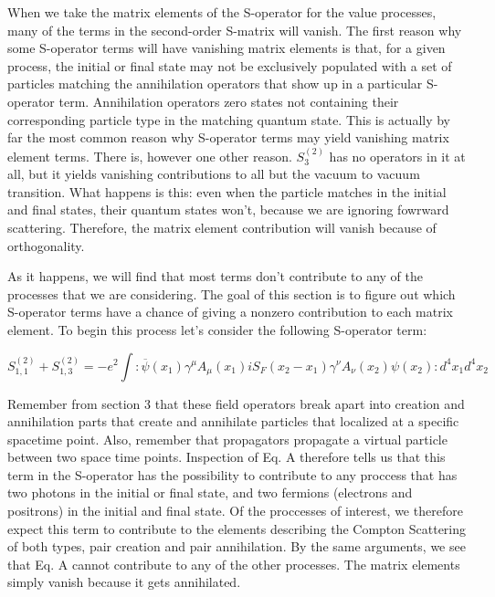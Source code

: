 \documentclass[a4]{article}
\begin{document}
    When we take the matrix elements of the S-operator for the value processes, many of the terms in the second-order S-matrix will vanish. The first
    reason why some S-operator terms will have vanishing matrix elements is that, for a given process, the initial or final state may not be 
    exclusively populated with a set of particles matching the annihilation operators that show up in a particular S-operator term. Annihilation 
    operators zero states not containing their corresponding particle type in the matching quantum state. This is actually by far the most common 
    reason why S-operator terms may yield vanishing matrix element terms. There is, however one other reason. $S^{(2)}_{3}$ has no operators in it at
    all, but it yields vanishing contributions to all but the vacuum to vacuum transition. What happens is this: even when the particle matches in the
    initial and final states, their quantum states won't, because we are ignoring fowrward scattering. Therefore, the matrix element contribution will
    vanish because of orthogonality.

    As it happens, we will find that most terms don't contribute to any of the processes that we are considering. The goal of this section is to figure
    out which S-operator terms have a chance of giving a nonzero contribution to each matrix element. To begin this process let's consider the following
    S-operator term:

    \begin{framed}
        \begin{equation}
            S^{(2)}_{1,1} + S^{(2)}_{1,3} = - e^{2} \int :\overline{\psi} (x_1) \gamma^{\mu} A_{\mu} (x_1) i S_{F} (x_2 - x_1) \gamma^{\nu} A_{\nu} (x_2) \psi (x_2): d^{4} x_{1} d^{4} x_{2}
        \end{equation}
    \end{framed}

    Remember from section 3 that these field operators break apart into creation and annihilation parts that create and annihilate particles that localized
    at a specific spacetime point. Also, remember that propagators propagate a virtual particle between two space time points. Inspection of Eq. A therefore
    tells us that this term in the S-operator has the possibility to contribute to any proccess that has two photons in the initial or final state, and two
    fermions (electrons and positrons) in the initial and final state. Of the proccesses of interest, we therefore expect this term to contribute to the
    elements describing the Compton Scattering of both types, pair creation and pair annihilation. By the same arguments, we see that Eq. A cannot contribute
    to any of the other processes. The matrix elements simply vanish because it gets annihilated. 
\end{document}
